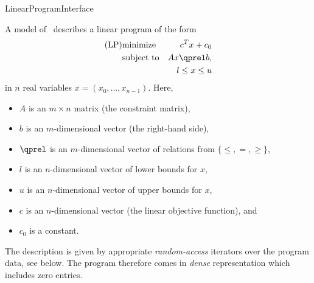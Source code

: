 \begin{ccRefConcept}{LinearProgramInterface}

\ccDefinition
A model of \ccRefName\ describes a linear program of the form
\begin{eqnarray*}
\mbox{(LP)}& \mbox{minimize} & c^{T}x+c_0 \\
&\mbox{subject to}   & Ax\qprel b, \\
&                    & l \leq x \leq u
\end{eqnarray*}
in $n$ real variables $x=(x_0,\ldots,x_{n-1})$.
Here, 
\begin{itemize}
\item $A$ is an $m\times n$ matrix (the constraint matrix), 
\item $b$ is an $m$-dimensional vector (the right-hand side),
\item $\qprel$ is an $m$-dimensional vector of relations 
from $\{\leq, =, \geq\}$, 
\item $l$ is an $n$-dimensional vector of lower
bounds for $x$,
\item $u$ is an $n$-dimensional vector of upper bounds for
$x$, 
\item $c$ is an $n$-dimensional vector (the linear objective
  function), and 
\item $c_0$ is a constant.
\end{itemize}

The description is given by appropriate \emph{random-access} 
iterators over the program data, see below. The program therefore 
comes in \emph{dense} representation which includes zero entries.

\ccHasModels
{}\\
\\
\\
\\

\ccTypes





\end{ccRefConcept}
